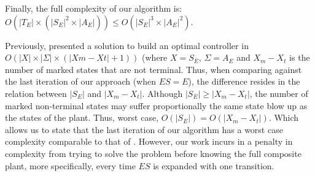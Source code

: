 Finally, the full complexity of our algorithm is: $O(|T_E| \times (|S_E|^2 \times |A_E|)) \leq O(|S_E|^3 \times |A_E|^2)$.

Previously, \cite{Huang:2007:Optimal}
presented a solution to build an optimal 
controller in $O(|X| \times |\Sigma| × (|X m − X t | + 1))$ (where $X=S_E$, $\Sigma = A_E$ and $X_m - X_t$ is the number of 
marked states that are not terminal. Thus, when comparing  \cite{Huang:2007:Optimal} 
against the last iteration of our approach (when $ES=E$), the difference resides in the relation 
between $|S_E|$ and $|X_m - X_t|$. Although $|S_E| \geq |X_m - X_t|$, the number of  
marked non-terminal states may suffer proportionally the same state blow up as the states of 
the plant. Thus, worst case, $O(|S_E|) = O(|X_m - X_t|)$. Which allows us to state that 
the  last iteration of 
our algorithm has a worst case complexity comparable to that of  
\cite{Huang:2007:Optimal}.
However,  our work incurs in a penalty in complexity from trying 
to solve the problem before knowing the full composite plant, more specifically, every time  
$ES$ is expanded with one transition. 
